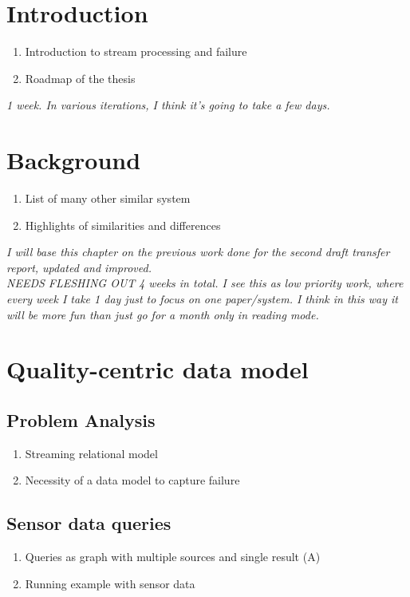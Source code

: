 %



\section{Introduction}
\begin{enumerate}
	\item Introduction to stream processing and failure
	\item Roadmap of the thesis
\end{enumerate}
\emph{1 week. In various iterations, I think it's going to take a few days.}

\section{Background}
\begin{enumerate}
	\item List of many other similar system
	\item Highlights of similarities and differences
\end{enumerate}	
\emph{I will base this chapter on the previous work done for the second draft transfer report, updated and improved.\\ NEEDS FLESHING OUT}
\emph{4 weeks in total. I see this as low priority work, where every week I take 1 day just to focus on one paper/system. I think in this way it will be more fun than just go for a month only in reading mode.}

\section{Quality-centric data model}

\subsection{Problem Analysis}
\begin{enumerate}
	\item Streaming relational model
	\item Necessity of a data model to capture failure
\end{enumerate}	

\subsection{Sensor data queries}
\begin{enumerate}
	\item Queries as graph with multiple sources and single result (A)
	\item Running example with sensor data
\end{enumerate}

